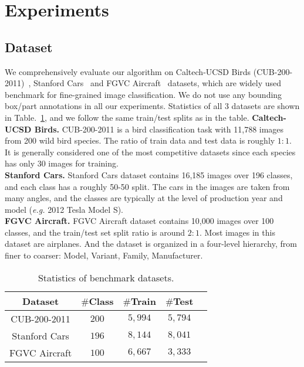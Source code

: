 \documentclass[runningheads]{llncs}
\begin{document}
\section{Experiments}\label{experiments}
\subsection{Dataset}
We comprehensively evaluate our algorithm on Caltech-UCSD Birds (CUB-200-2011)~\cite{WahCUB_200_2011}, Stanford Cars~\cite{Krause20133D} and FGVC Aircraft~\cite{maji13fine-grained} datasets, which are widely used benchmark for fine-grained image classification. We do not use any bounding box/part annotations in all our experiments. Statistics of all 3 datasets are shown in Table.~\ref{data_stat}, and we follow the same train/test splits as in the table.
\textbf{Caltech-UCSD Birds.}
CUB-200-2011 is a bird classification task with 11,788 images from 200 wild bird species. The ratio of train data and test data is roughly $1:1$. It is generally considered one of the most competitive datasets since each species has only 30 images for training.\\
\textbf{Stanford Cars.}
Stanford Cars dataset contains 16,185 images over 196 classes, and each class has a roughly 50-50 split. The cars in the images are taken from many angles, and the classes are typically at the level of production year and model (\emph{e.g.} 2012 Tesla Model S).\\
\textbf{FGVC Aircraft.}
FGVC Aircraft dataset contains 10,000 images over 100 classes, and the train/test set split ratio is around $2:1$. Most images in this dataset are airplanes. And the dataset is organized in a four-level hierarchy, from finer to coarser: Model, Variant, Family, Manufacturer.

\begin{table}[ht]
	\begin{center}
	\begin{tabular}{|c|c|c|c|c|}
	\hline
	Dataset & $\#$Class & $\#$Train & $\#$Test \\
	\hline\hline
	CUB-200-2011 & $200$ & $5,994$ & $5,794$ \\
	\hline
	Stanford Cars & $196$ & $8,144$ & $8,041$ \\
	\hline
	FGVC Aircraft & $100$ & $6,667$ & $3,333$ \\
	\hline
	\end{tabular}
	\end{center}
\caption{Statistics of benchmark datasets.}
\label{data_stat}
\end{table}
\end{document}
